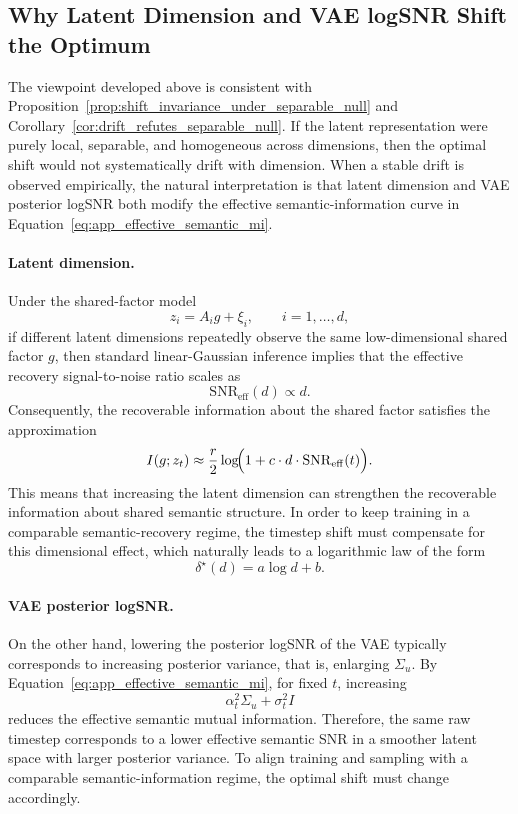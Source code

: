 \subsection{Why Latent Dimension and VAE logSNR Shift the Optimum}
\label{app:dimension_and_vae_logsnr_shift}

The viewpoint developed above is consistent with Proposition~\ref{prop:shift_invariance_under_separable_null} and Corollary~\ref{cor:drift_refutes_separable_null}. If the latent representation were purely local, separable, and homogeneous across dimensions, then the optimal shift would not systematically drift with dimension. When a stable drift is observed empirically, the natural interpretation is that latent dimension and VAE posterior logSNR both modify the effective semantic-information curve in Equation~\eqref{eq:app_effective_semantic_mi}.

\paragraph{Latent dimension.}
Under the shared-factor model
\begin{equation}
z_i=A_i g+\xi_i,
\qquad
i=1,\dots,d,
\label{eq:app_shared_factor_model_again}
\end{equation}
if different latent dimensions repeatedly observe the same low-dimensional shared factor $g$, then standard linear-Gaussian inference implies that the effective recovery signal-to-noise ratio scales as
\begin{equation}
\mathrm{SNR}_{\mathrm{eff}}(d)\propto d.
\label{eq:app_snr_eff_dim}
\end{equation}
Consequently, the recoverable information about the shared factor satisfies the approximation
\begin{equation}
I(g;z_t)
\approx
\frac{r}{2}\log\!\Bigl(1+c\cdot d\cdot \mathrm{SNR}_{\mathrm{eff}}(t)\Bigr).
\label{eq:app_mi_shared_factor_again}
\end{equation}
This means that increasing the latent dimension can strengthen the recoverable information about shared semantic structure. In order to keep training in a comparable semantic-recovery regime, the timestep shift must compensate for this dimensional effect, which naturally leads to a logarithmic law of the form
\begin{equation}
\delta^{\star}(d)=a\log d+b.
\label{eq:app_delta_log_d_again}
\end{equation}

\paragraph{VAE posterior logSNR.}
On the other hand, lowering the posterior logSNR of the VAE typically corresponds to increasing posterior variance, that is, enlarging $\Sigma_u$. By Equation~\eqref{eq:app_effective_semantic_mi}, for fixed $t$, increasing
\[
\alpha_t^2\Sigma_u+\sigma_t^2 I
\]
reduces the effective semantic mutual information. Therefore, the same raw timestep corresponds to a lower effective semantic SNR in a smoother latent space with larger posterior variance. To align training and sampling with a comparable semantic-information regime, the optimal shift must change accordingly.

